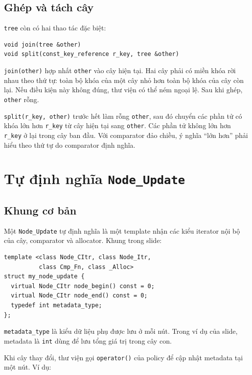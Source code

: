 \documentclass[11pt]{article}
\begin{document}
\subsection{Ghép và tách cây}

\texttt{tree} còn có hai thao tác đặc biệt:

\begingroup
\small
\begin{verbatim}
void join(tree &other)
void split(const_key_reference r_key, tree &other)
\end{verbatim}
\endgroup

\texttt{join(other)} hợp nhất \texttt{other} vào cây hiện tại. Hai cây phải có
miền khóa rời nhau theo thứ tự: toàn bộ khóa của một cây nhỏ hơn toàn bộ khóa
của cây còn lại. Nếu điều kiện này không đúng, thư viện có thể ném ngoại lệ.
Sau khi ghép, \texttt{other} rỗng.

\texttt{split(r\_key, other)} trước hết làm rỗng \texttt{other}, sau đó chuyển
các phần tử có khóa lớn hơn \texttt{r\_key} từ cây hiện tại sang
\texttt{other}. Các phần tử không lớn hơn \texttt{r\_key} ở lại trong cây ban
đầu. Với comparator đảo chiều, ý nghĩa ``lớn hơn'' phải hiểu theo thứ tự do
comparator định nghĩa.

\section{Tự định nghĩa \texorpdfstring{\texttt{Node\_Update}}{Node Update}}

\subsection{Khung cơ bản}

Một \texttt{Node\_Update} tự định nghĩa là một template nhận các kiểu iterator
nội bộ của cây, comparator và allocator. Khung trong slide:

\begingroup
\small
\begin{verbatim}
template <class Node_CItr, class Node_Itr,
          class Cmp_Fn, class _Alloc>
struct my_node_update {
  virtual Node_CItr node_begin() const = 0;
  virtual Node_CItr node_end() const = 0;
  typedef int metadata_type;
};
\end{verbatim}
\endgroup

\texttt{metadata\_type} là kiểu dữ liệu phụ được lưu ở mỗi nút. Trong ví dụ
của slide, metadata là \texttt{int} dùng để lưu tổng giá trị trong cây con.

Khi cây thay đổi, thư viện gọi \texttt{operator()} của policy để cập nhật
metadata tại một nút. Ví dụ:
\end{document}
